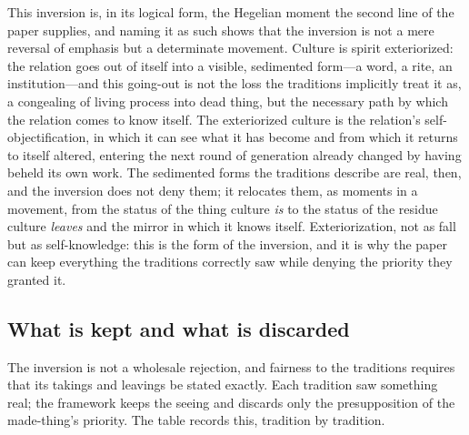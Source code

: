 This inversion is, in its logical form, the Hegelian moment the second line of the paper supplies, and naming it as such shows that the inversion is not a mere reversal of emphasis but a determinate movement. Culture is spirit exteriorized: the relation goes out of itself into a visible, sedimented form---a word, a rite, an institution---and this going-out is not the loss the traditions implicitly treat it as, a congealing of living process into dead thing, but the necessary path by which the relation comes to know itself. The exteriorized culture is the relation's self-objectification, in which it can see what it has become and from which it returns to itself altered, entering the next round of generation already changed by having beheld its own work. The sedimented forms the traditions describe are real, then, and the inversion does not deny them; it relocates them, as moments in a movement, from the status of the thing culture \emph{is} to the status of the residue culture \emph{leaves} and the mirror in which it knows itself. Exteriorization, not as fall but as self-knowledge: this is the form of the inversion, and it is why the paper can keep everything the traditions correctly saw while denying the priority they granted it.

\subsection*{What is kept and what is discarded}

The inversion is not a wholesale rejection, and fairness to the traditions requires that its takings and leavings be stated exactly. Each tradition saw something real; the framework keeps the seeing and discards only the presupposition of the made-thing's priority. The table records this, tradition by tradition.

